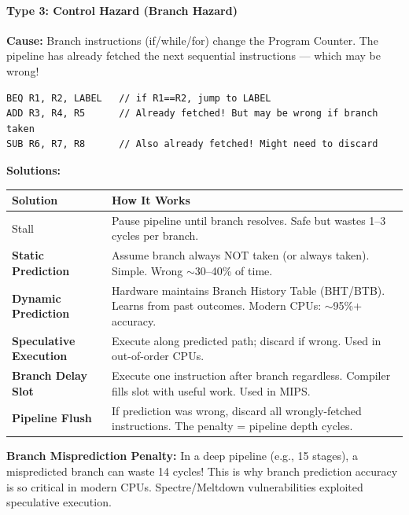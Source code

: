 \documentclass[11pt,a4paper]{article}
\newcommand{\term}[1]{\textbf{\color{darkblue}#1}}
\begin{document}
\paragraph{Type 3: Control Hazard (Branch Hazard)}

\textbf{Cause:} Branch instructions (if/while/for) change the Program Counter. The pipeline has already fetched the next sequential instructions --- which may be wrong!

\begin{lstlisting}
BEQ R1, R2, LABEL   // if R1==R2, jump to LABEL
ADD R3, R4, R5      // Already fetched! But may be wrong if branch taken
SUB R6, R7, R8      // Also already fetched! Might need to discard
\end{lstlisting}

\textbf{Solutions:}

\begin{center}
\begin{tabular}{L{4cm} L{9cm}}
\toprule
\textbf{Solution} & \textbf{How It Works} \\
\midrule
Stall & Pause pipeline until branch resolves. Safe but wastes 1--3 cycles per branch. \\[4pt]
\term{Static Prediction} & Assume branch always NOT taken (or always taken). Simple. Wrong $\sim$30--40\% of time. \\[4pt]
\term{Dynamic Prediction} & Hardware maintains Branch History Table (BHT/BTB). Learns from past outcomes. Modern CPUs: $\sim$95\%+ accuracy. \\[4pt]
\term{Speculative Execution} & Execute along predicted path; discard if wrong. Used in out-of-order CPUs. \\[4pt]
\term{Branch Delay Slot} & Execute one instruction after branch regardless. Compiler fills slot with useful work. Used in MIPS. \\[4pt]
\term{Pipeline Flush} & If prediction was wrong, discard all wrongly-fetched instructions. The penalty = pipeline depth cycles. \\
\bottomrule
\end{tabular}
\end{center}

\begin{important}
\textbf{Branch Misprediction Penalty:} In a deep pipeline (e.g., 15 stages), a mispredicted branch can waste 14 cycles! This is why branch prediction accuracy is so critical in modern CPUs. Spectre/Meltdown vulnerabilities exploited speculative execution.
\end{important}
\end{document}
